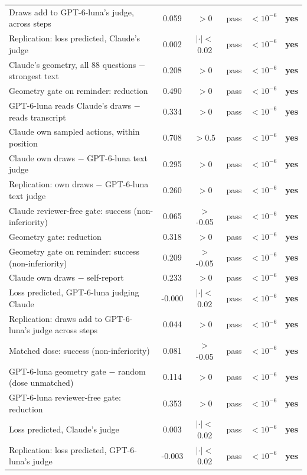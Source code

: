 \begin{center}
\begin{tabular}{@{}lccccc@{}}
Draws add to GPT-6-luna's judge, across steps & 0.059 & $>$0 & pass & $<10^{-6}$ & \textbf{yes}\\
Replication: loss predicted, Claude's judge & 0.002 & $|\cdot|<$0.02 & pass & $<10^{-6}$ & \textbf{yes}\\
Claude's geometry, all 88 questions $-$ strongest text & 0.208 & $>$0 & pass & $<10^{-6}$ & \textbf{yes}\\
Geometry gate on reminder: reduction & 0.490 & $>$0 & pass & $<10^{-6}$ & \textbf{yes}\\
GPT-6-luna reads Claude's draws $-$ reads transcript & 0.334 & $>$0 & pass & $<10^{-6}$ & \textbf{yes}\\
Claude own sampled actions, within position & 0.708 & $>$0.5 & pass & $<10^{-6}$ & \textbf{yes}\\
Claude own draws $-$ GPT-6-luna text judge & 0.295 & $>$0 & pass & $<10^{-6}$ & \textbf{yes}\\
Replication: own draws $-$ GPT-6-luna text judge & 0.260 & $>$0 & pass & $<10^{-6}$ & \textbf{yes}\\
Claude reviewer-free gate: success (non-inferiority) & 0.065 & $>$-0.05 & pass & $<10^{-6}$ & \textbf{yes}\\
Geometry gate: reduction & 0.318 & $>$0 & pass & $<10^{-6}$ & \textbf{yes}\\
Geometry gate on reminder: success (non-inferiority) & 0.209 & $>$-0.05 & pass & $<10^{-6}$ & \textbf{yes}\\
Claude own draws $-$ self-report & 0.233 & $>$0 & pass & $<10^{-6}$ & \textbf{yes}\\
Loss predicted, GPT-6-luna judging Claude & -0.000 & $|\cdot|<$0.02 & pass & $<10^{-6}$ & \textbf{yes}\\
Replication: draws add to GPT-6-luna's judge across steps & 0.044 & $>$0 & pass & $<10^{-6}$ & \textbf{yes}\\
Matched dose: success (non-inferiority) & 0.081 & $>$-0.05 & pass & $<10^{-6}$ & \textbf{yes}\\
GPT-6-luna geometry gate $-$ random (dose unmatched) & 0.114 & $>$0 & pass & $<10^{-6}$ & \textbf{yes}\\
GPT-6-luna reviewer-free gate: reduction & 0.353 & $>$0 & pass & $<10^{-6}$ & \textbf{yes}\\
Loss predicted, Claude's judge & 0.003 & $|\cdot|<$0.02 & pass & $<10^{-6}$ & \textbf{yes}\\
Replication: loss predicted, GPT-6-luna's judge & -0.003 & $|\cdot|<$0.02 & pass & $<10^{-6}$ & \textbf{yes}\\

\end{tabular}
\end{center}
